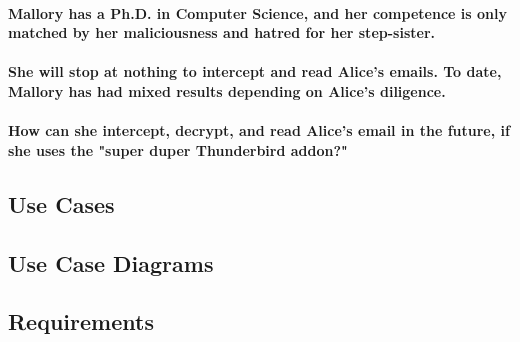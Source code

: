 \paragraph{Mallory has a Ph.D. in Computer Science, and her competence is only matched by her maliciousness and hatred for her step-sister.}
\paragraph{She will stop at nothing to intercept and read Alice's emails. To date, Mallory has had mixed results depending on Alice's diligence.}
\paragraph{How can she intercept, decrypt, and read Alice's email in the future, if she uses the "super duper Thunderbird addon?"}

\subsection{Use Cases}
\subsection{Use Case Diagrams}
\subsection{Requirements}